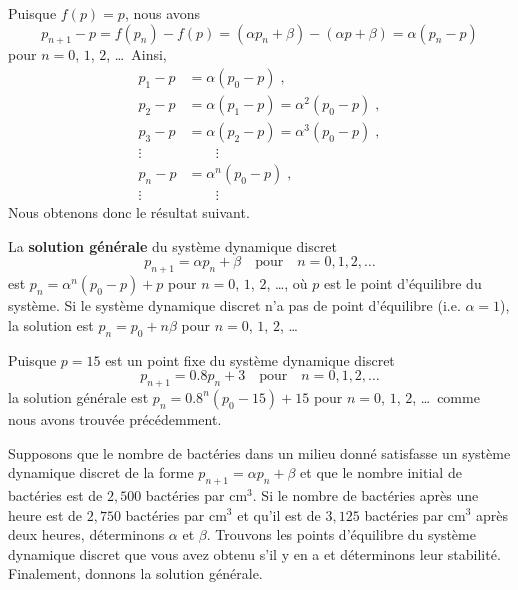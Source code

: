 {Puisque $f(p) = p$, nous avons
\[
p_{n+1} - p = f(p_n) - f(p) = (\alpha p_n + \beta) - (\alpha p + \beta)
= \alpha(p_n - p)
\]
pour $n=0$, $1$, $2$, \ldots\  Ainsi,
\begin{align*}
p_1-p &= \alpha (p_0-p) \; , \\
p_2-p &= \alpha (p_1-p) = \alpha^2 (p_0-p) \; , \\
p_3-p &= \alpha (p_2-p) = \alpha^3 (p_0-p) \; , \\
\vdots \qquad & \qquad \vdots \\
p_n-p &= \alpha^n (p_0-p) \;, \\
\vdots \qquad & \qquad \vdots
\end{align*}
Nous obtenons donc le résultat suivant.

\begin{focus}{\prp}
La {\bfseries solution générale} du système dynamique discret  
\[
p_{n+1}= \alpha p_n + \beta  \quad \text{pour} \quad n=0, 1, 2, \ldots
\]
est $p_n = \alpha^n (p_0-p) + p$ pour $n=0$, $1$, $2$, \ldots, où $p$ est le
point d'équilibre du système.  Si le système dynamique discret n'a pas de
point d'équilibre (i.e. $\alpha =1$), la solution est $p_n = p_0 + n \beta$
pour $n=0$, $1$, $2$, \ldots
\end{focus}

\begin{egg}
Puisque $p=15$ est un point fixe du système dynamique discret
\[
p_{n+1} = 0.8p_n + 3 \quad \text{pour} \quad n=0, 1, 2, \ldots
\]
la solution générale est $p_n = 0.8^n (p_0-15) + 15$ pour $n=0$, $1$,
$2$, \ldots\ comme nous avons trouvée précédemment.
\end{egg}

\begin{egg}
Supposons que le nombre de bactéries dans un milieu donné satisfasse un
système dynamique discret de la forme
$\displaystyle p_{n+1} = \alpha p_n + \beta$ et que
le nombre initial de bactéries est de $2,500$ bactéries par cm$^3$.
Si le nombre de bactéries après une heure est de $2,750$ bactéries par
cm$^3$ et qu'il est de $3,125$ bactéries par cm$^3$ après deux heures,
déterminons $\alpha$ et $\beta$.  Trouvons les points d'équilibre du
système dynamique discret que vous avez obtenu s'il y en a et
déterminons leur stabilité. Finalement, donnons la solution
générale.


\end{egg}}
